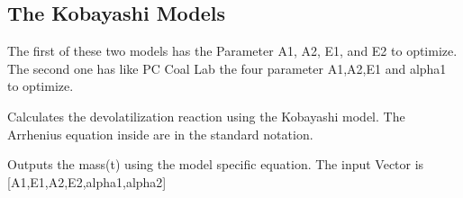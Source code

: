 \documentclass[letterpaper,10pt,english]{sphinxmanual}
\begin{document}
\subsection{The Kobayashi Models}
\label{FittingClasses:the-kobayashi-models}
The first of these two models has the Parameter A1, A2, E1, and E2 to optimize. The second one has like  PC Coal Lab the four parameter A1,A2,E1 and alpha1 to optimize.

\begin{fulllineitems}
\label{FittingClasses:Models.Kobayashi}
Calculates the devolatilization reaction using the Kobayashi model. The Arrhenius equation inside are in the standard notation.

\begin{fulllineitems}
\label{FittingClasses:Models.Kobayashi.calcMass}
Outputs the mass(t) using the model specific equation. The input Vector is {[}A1,E1,A2,E2,alpha1,alpha2{]}

\end{fulllineitems}


\end{fulllineitems}

\end{document}
